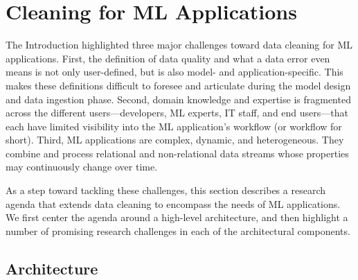 \documentclass[11pt,dvipsnames]{article}
\begin{document}
\section{Cleaning for ML Applications}\label{sec:vison}

The Introduction highlighted three major challenges toward data cleaning for ML applications.
First, the definition of data quality and what a data error even means is not only user-defined, but is also model- and application-specific.  This makes these definitions difficult to foresee and articulate during the model design and data ingestion phase.
Second, domain knowledge and expertise is fragmented across the different users---developers, ML experts, IT staff, and end users---that each have limited visibility into the ML application's workflow (or workflow for short).
Third, ML applications are complex, dynamic, and heterogeneous.  They combine and process relational and non-relational data streams whose properties may continuously change over time.  

As a step toward tackling these challenges, this section describes a research agenda that extends data cleaning to encompass the needs of ML applications.  
We first center the agenda around a high-level architecture, and then highlight a number of promising research challenges in each of the architectural components.

\subsection{Architecture}
\end{document}
